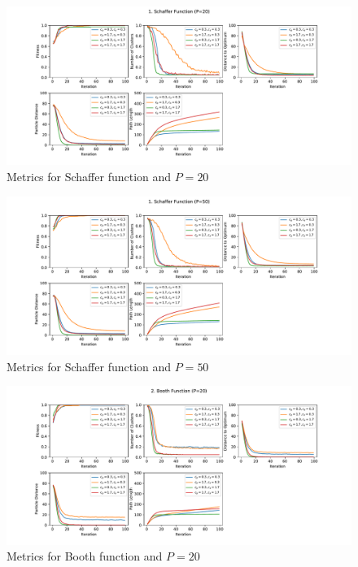 \documentclass[12pt]{article}
\begin{document}
\begin{figure}[h!]
	\centering
	\includegraphics[width=1\textwidth]{figures/ex4/ex4-1-20.pdf}
	\caption{Metrics for Schaffer function and $P=20$}
	\label{fig:ex4-1-20}
\end{figure}
\begin{figure}[h!]
	\centering
	\includegraphics[width=1\textwidth]{figures/ex4/ex4-1-50.pdf}
	\caption{Metrics for Schaffer function and $P=50$}
	\label{fig:ex4-1-50}
\end{figure}
\begin{figure}[h!]
	\centering
	\includegraphics[width=1\textwidth]{figures/ex4/ex4-2-20.pdf}
	\caption{Metrics for Booth function and $P=20$}
	\label{fig:ex4-2-20}
\end{figure}
\end{document}
